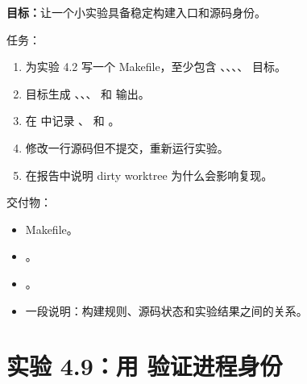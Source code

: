 \begin{labbox}
\textbf{目标：}让一个小实验具备稳定构建入口和源码身份。

任务：

\begin{enumerate}
  \item 为实验 4.2 写一个 Makefile，至少包含 、、、、 目标。
  \item {} 目标生成 、、、 和  输出。
  \item 在  中记录 、 和 。
  \item 修改一行源码但不提交，重新运行实验。
  \item 在报告中说明 dirty worktree 为什么会影响复现。
\end{enumerate}

交付物：

\begin{itemize}
  \item Makefile。
  \item {}。
  \item {}。
  \item 一段说明：构建规则、源码状态和实验结果之间的关系。
\end{itemize}
\end{labbox}

\section{实验 4.9：用  验证进程身份}

